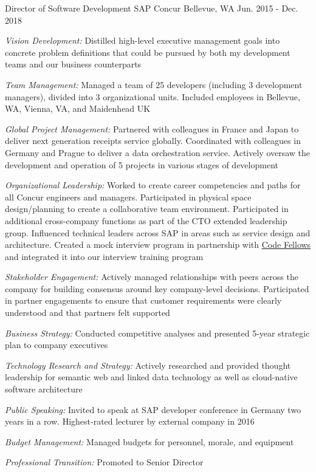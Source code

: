 \begin{cventries}
\cventry
{Director of Software Development} %
{SAP Concur} %
{Bellevue, WA} %
{Jun. 2015 - Dec. 2018} %
{ %
\begin{cvitems}
\item {\emph{Vision Development:} Distilled high-level executive management goals into concrete problem definitions that could be pursued by both my development teams and our business counterparts }
\item {\emph{Team Management:} Managed a team of 25 developers (including 3 development managers), divided into 3 organizational units. Included employees in Bellevue, WA, Vienna, VA, and Maidenhead UK }
\item {\emph{Global Project Management:} Partnered with colleagues in France and Japan to deliver next generation receipts service globally. Coordinated with colleagues in Germany and Prague to deliver a data orchestration service. Actively oversaw the development and operation of 5 projects in various stages of development }
\item {\emph{Organizational Leadership:} Worked to create career competencies and paths for all Concur engineers and managers. Participated in physical space design/planning to create a collaborative team environment. Participated in additional cross-company functions as part of the CTO extended leadership group. Influenced technical leaders across SAP in areas such as service design and architecture. Created a mock interview program in partnership with \href{https://www.codefellows.org/}{Code Fellows} and integrated it into our interview training program }
\item {\emph{Stakeholder Engagement:} Actively managed relationships with peers across the company for building consensus around key company-level decisions. Participated in partner engagements to ensure that customer requirements were clearly understood and that partners felt supported }
\item {\emph{Business Strategy:} Conducted competitive analyses and presented 5-year strategic plan to company executives }
\item {\emph{Technology Research and Strategy:} Actively researched and provided thought leadership for semantic web and linked data technology as well as cloud-native software architecture }
\item {\emph{Public Speaking:} Invited to speak at SAP developer conference in Germany two years in a row. Highest-rated lecturer by external company in 2016 }
\item {\emph{Budget Management:} Managed budgets for personnel, morale, and equipment }
\item {\emph{Professional Transition:} Promoted to Senior Director }
\end{cvitems}
}


\end{cventries}
